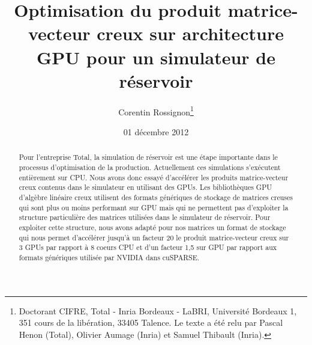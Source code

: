 \documentclass[renpar]{compas2013}
\begin{document}
\title{Optimisation du produit matrice-vecteur creux sur architecture GPU pour un simulateur de réservoir}

\author{Corentin Rossignon\thanks{Doctorant CIFRE, Total - Inria Bordeaux - LaBRI, Université Bordeaux 1, 351 cours de la libération, 33405 Talence. Le texte a été relu par Pascal Henon (Total), Olivier Aumage (Inria) et Samuel Thibault (Inria).}}%

\address{Total CSTJF - PAU\\
Avenue Larribau\\
64000 Pau - France\\
Corentin.Rossignon@Total.com}

\date{01 décembre 2012}

\maketitle

\begin{abstract}
  Pour l'entreprise Total, la simulation de réservoir est une étape importante
  dans le processus d'optimisation de la production. Actuellement ces simulations
  s'exécutent entièrement sur CPU. Nous avons donc essayé d'accélérer les produits
  matrice-vecteur creux contenus dans le simulateur en utilisant des GPUs.
  Les bibliothèques GPU d'algèbre linéaire creux utilisent des formats génériques de stockage 
  de matrices creuses qui sont plus ou moins performant sur GPU mais qui ne
  permettent pas d'exploiter la structure
  particulière des matrices utilisées dans le simulateur de réservoir.
  Pour exploiter cette structure, nous avons adapté pour nos matrices un format de stockage
  qui nous permet d'accélérer jusqu'à un facteur 20 le produit
  matrice-vecteur creux sur 3 GPUs par rapport à 8 coeurs CPU et d'un facteur 1,5 sur GPU
  par rapport aux formats génériques utilisée par NVIDIA dans cuSPARSE.

\end{abstract}
\end{document}
